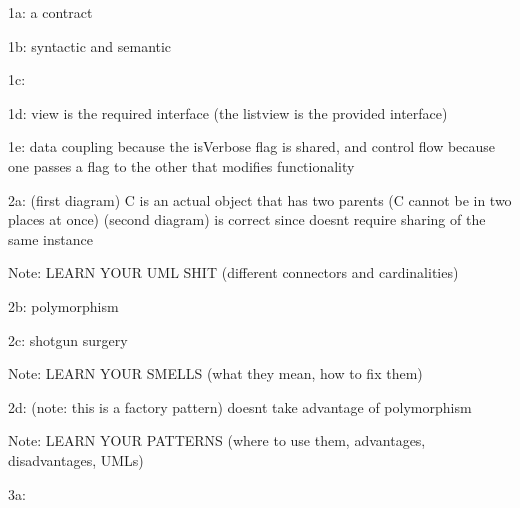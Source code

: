 \documentclass{article}
\begin{document}
1a: a contract

1b: syntactic and semantic

1c:

1d: view is the required interface (the listview is the provided interface)

1e: data coupling because the isVerbose flag is shared, and control flow because one passes a flag to the other that modifies functionality

2a: (first diagram) C is an actual object that has two parents (C cannot be in two places at once)
(second diagram) is correct since doesnt require sharing of the same instance

Note: LEARN YOUR UML SHIT (different connectors and cardinalities)

2b: polymorphism

2c: shotgun surgery

Note: LEARN YOUR SMELLS (what they mean, how to fix them)

2d: (note: this is a factory pattern) doesnt take advantage of polymorphism

Note: LEARN YOUR PATTERNS (where to use them, advantages, disadvantages, UMLs)

3a:
\end{document}
